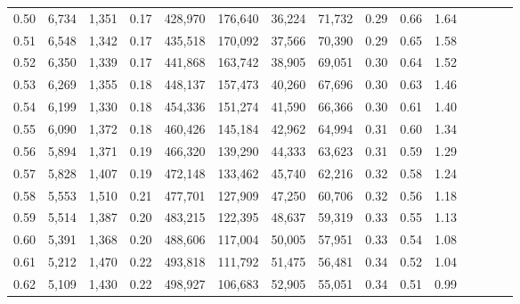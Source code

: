 \begin{tabular}{rrrcrrrrrrrrrrr}
0.50 &   6,734 &  1,351 &                                       0.17 &  428,970 &  176,640 &   36,224 &   71,732 &  0.29 &  0.66 &                         1.64 \\
0.51 &   6,548 &  1,342 &                                       0.17 &  435,518 &  170,092 &   37,566 &   70,390 &  0.29 &  0.65 &                         1.58 \\
0.52 &   6,350 &  1,339 &                                       0.17 &  441,868 &  163,742 &   38,905 &   69,051 &  0.30 &  0.64 &                         1.52 \\
0.53 &   6,269 &  1,355 &                                       0.18 &  448,137 &  157,473 &   40,260 &   67,696 &  0.30 &  0.63 &                         1.46 \\
0.54 &   6,199 &  1,330 &                                       0.18 &  454,336 &  151,274 &   41,590 &   66,366 &  0.30 &  0.61 &                         1.40 \\
0.55 &   6,090 &  1,372 &                                       0.18 &  460,426 &  145,184 &   42,962 &   64,994 &  0.31 &  0.60 &                         1.34 \\
0.56 &   5,894 &  1,371 &                                       0.19 &  466,320 &  139,290 &   44,333 &   63,623 &  0.31 &  0.59 &                         1.29 \\
0.57 &   5,828 &  1,407 &                                       0.19 &  472,148 &  133,462 &   45,740 &   62,216 &  0.32 &  0.58 &                         1.24 \\
0.58 &   5,553 &  1,510 &                                       0.21 &  477,701 &  127,909 &   47,250 &   60,706 &  0.32 &  0.56 &                         1.18 \\
0.59 &   5,514 &  1,387 &                                       0.20 &  483,215 &  122,395 &   48,637 &   59,319 &  0.33 &  0.55 &                         1.13 \\
0.60 &   5,391 &  1,368 &                                       0.20 &  488,606 &  117,004 &   50,005 &   57,951 &  0.33 &  0.54 &                         1.08 \\
0.61 &   5,212 &  1,470 &                                       0.22 &  493,818 &  111,792 &   51,475 &   56,481 &  0.34 &  0.52 &                         1.04 \\
0.62 &   5,109 &  1,430 &                                       0.22 &  498,927 &  106,683 &   52,905 &   55,051 &  0.34 &  0.51 &                         0.99 \\

\end{tabular}
